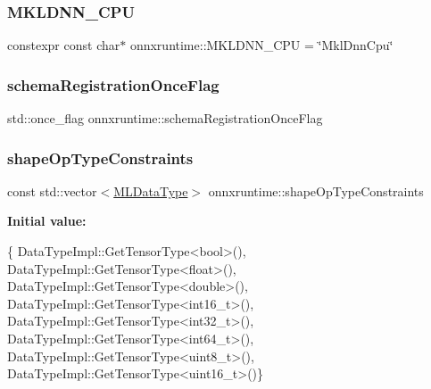 \subsubsection{\texorpdfstring{M\+K\+L\+D\+N\+N\+\_\+\+C\+PU}{MKLDNN\_CPU}}
{\footnotesize\ttfamily constexpr const char$\ast$ onnxruntime\+::\+M\+K\+L\+D\+N\+N\+\_\+\+C\+PU = \char`\"{}Mkl\+Dnn\+Cpu\char`\"{}}

\mbox{\label{namespaceonnxruntime_a94e66331bfcd428a630476bbf0e2733f}} 
\subsubsection{\texorpdfstring{schema\+Registration\+Once\+Flag}{schemaRegistrationOnceFlag}}
{\footnotesize\ttfamily std\+::once\+\_\+flag onnxruntime\+::schema\+Registration\+Once\+Flag}

\mbox{\label{namespaceonnxruntime_a20b1177be7f6d1d313e81b0441fa7664}} 
\subsubsection{\texorpdfstring{shape\+Op\+Type\+Constraints}{shapeOpTypeConstraints}}
{\footnotesize\ttfamily const std\+::vector$<$\mbox{\hyperlink{namespaceonnxruntime_ad77d0a6e838ec7da5dc35fed5ee66b49}{M\+L\+Data\+Type}}$>$ onnxruntime\+::shape\+Op\+Type\+Constraints}

{\bfseries Initial value\+:}
\begin{DoxyCode}
\{
    DataTypeImpl::GetTensorType<bool>(),
    DataTypeImpl::GetTensorType<float>(),
    DataTypeImpl::GetTensorType<double>(),
    DataTypeImpl::GetTensorType<int16\_t>(),
    DataTypeImpl::GetTensorType<int32\_t>(),
    DataTypeImpl::GetTensorType<int64\_t>(),
    DataTypeImpl::GetTensorType<uint8\_t>(),
    DataTypeImpl::GetTensorType<uint16\_t>()\}
\end{DoxyCode}
\mbox{\label{namespaceonnxruntime_a33c9de98d6481d456b397e3f20d2ff46}} 
